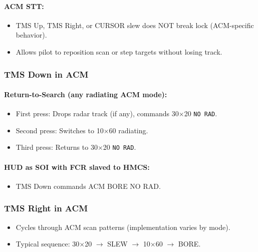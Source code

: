 \documentclass[11pt, a4paper, twoside]{report}
\begin{document}
\paragraph{ACM STT:}
\begin{itemize}[nosep]
    \item TMS Up, TMS Right, or CURSOR slew does NOT break lock (ACM-specific behavior).
    \item Allows pilot to reposition scan or step targets without losing track.
\end{itemize}

\subsubsection*{TMS Down in ACM}
\label{sec:C4-S3-S4-S2}

\paragraph{Return-to-Search (any radiating ACM mode):}
\begin{itemize}[nosep]
    \item First press: Drops radar track (if any), commands 30$\times$20 \texttt{NO RAD}.
    \item Second press: Switches to 10$\times$60 radiating.
    \item Third press: Returns to 30$\times$20 \texttt{NO RAD}.
\end{itemize}

\paragraph{HUD as SOI with FCR slaved to HMCS:}
\begin{itemize}[nosep]
    \item TMS Down commands ACM BORE NO RAD.
\end{itemize}

\subsubsection*{TMS Right in ACM}
\label{sec:C4-S3-S4-S3}

\begin{itemize}[nosep]
    \item Cycles through ACM scan patterns (implementation varies by mode).
    \item Typical sequence: 30$\times$20 $\rightarrow$ SLEW $\rightarrow$ 10$\times$60 $\rightarrow$ BORE.
\end{itemize}
\end{document}

